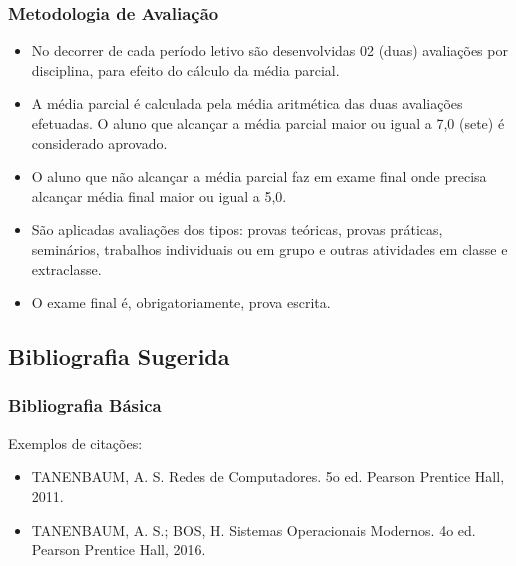 \begin{frame}[t]\frametitle{Metodologia de Avaliação}

  \begin{itemize}
    \justifying{}
    \setlength\itemsep{1em}
    \item No decorrer de cada período letivo são desenvolvidas 02 (duas) avaliações por disciplina, para efeito do cálculo da média parcial.
    \item A média parcial é calculada pela média aritmética das duas avaliações efetuadas. O aluno que alcançar a média parcial maior ou igual a 7,0 (sete) é considerado aprovado.
    \item O aluno que não alcançar a média parcial faz em exame final onde precisa alcançar média final maior ou igual a 5,0.
    \item São aplicadas avaliações dos tipos: provas teóricas, provas práticas, seminários, trabalhos individuais ou em grupo e outras atividades em classe e extraclasse.
    \item O exame final é, obrigatoriamente, prova escrita.
  \end{itemize}

\end{frame}



\subsection[Bibliografia Sugerida]{Bibliografia Sugerida}\label{subsec:sec02-bibliografia-sugerida}



\begin{frame}[t]\frametitle{Bibliografia Básica}

  Exemplos de citações:
  \begin{itemize}
    \justifying{}
    \setlength\itemsep{1em}
    \item TANENBAUM, A. S. Redes de Computadores. 5o ed. Pearson Prentice Hall, 2011. \cite{Tanenbaum2011}
    \item TANENBAUM, A. S.; BOS, H. Sistemas Operacionais Modernos. 4o ed. Pearson Prentice Hall, 2016. \cite{Tanenbaum2016}
  \end{itemize}

\end{frame}



